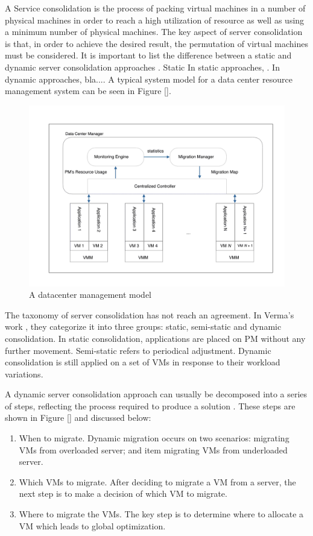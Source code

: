 A Service consolidation is the process of packing virtual machines in a number of physical 
machines in order to reach a high utilization of resource as well as using a minimum number of 
physical machines. The key aspect of server consolidation is that, in order to achieve the 
desired result, the permutation of virtual machines must be considered. It is important to list the 
difference between a static and dynamic server consolidation approaches \cite{}. 
Static 
In static approaches, . In dynamic approaches, bla.... A typical system model for a data center
resource management system can be seen in Figure \ref{}. 
\begin{figure}
	\centering
	\includegraphics[width=1.0\textwidth]{pics/dataCenter-1.png}
	\caption{A datacenter management model \cite{Varasteh:2015fu}}
	\label{fig:arch}
\end{figure}

The taxonomy of server consolidation has not reach an agreement. In Verma's work \cite{Verma:2009wi}, they categorize it into three groups: static, semi-static and dynamic consolidation. In static consolidation, applications are placed on PM without any further movement. Semi-static refers to periodical adjustment. Dynamic consolidation is still applied on a set of VMs in response to their workload variations.









A dynamic server consolidation approach
can usually be decomposed into a series of steps, 
reflecting the process required to produce a solution \cite{}. 
These steps are shown in Figure \ref{} and discussed below:
\begin{enumerate}
	\item When to migrate. Dynamic migration occurs on two scenarios: migrating VMs from overloaded server; and item migrating VMs from underloaded server.
	\item Which VMs to migrate.  After deciding to migrate a VM from a server, the next step is 
	to make a decision of which VM to migrate.
	\item Where to migrate the VMs. The key step is to determine where to allocate a VM which leads to global optimization.
\end{enumerate}


